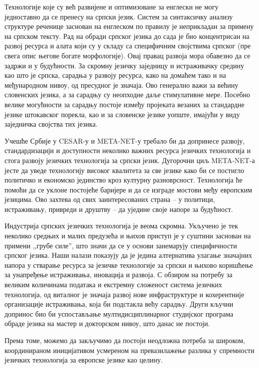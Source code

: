 {\begin{multicols}{2}
Технологије које су већ развијене и оптимизоване за енглески не могу једноставно да се пренесу на српски језик. Систем за синтаксичку анализу структуре реченице заснован на енглеском по правилу је неприкладан за примену на српском тексту. Рад на обради српског језика до сада је био концентрисан на развој ресурса и алата који су у складу са специфичним својствима српског (пре свега опис његове богате морфологије). Овај правац развоја мора обавезно да се задржи и у будућности. 
За скромну језичку заједницу и истраживачку средину као што је српска, сарадња у развоју ресурса, како на домаћем тако и на међународном нивоу,  од пресудног је значаја. Ово генерално  важи за већину словенских језика, а за сарадњу су неопходне даље стимулативне мере. Посебно велике могућности за сарадњу постоје између пројеката везаних за стандардне језике штокавског порекла, као и за словенске језике уопште, имајући у виду заједничка својства тих језика. 

Учешће Србије у CESAR-у и META-NET-у требало би да допринесе развоју, стандардизацији и доступности неколико важних ресурса језичких технологија и стога развоју језичких технологија за српски језик. Дугорочни циљ META-NET-а јесте да уведе технологију високог квалитета за све језике како би се постигло политичко и економско јединство кроз културну разноврсност. Технологија ће помоћи да се уклоне постојеће баријере и да се изграде мостови међу европским језицима. Ово захтева од свих заинтересованих страна – у политици, истраживању, привреди и друштву – да уједине своје напоре за будућност. 

Индустрија српских језичких технологија је веома скромна. Укључено је тек неколико средњих и малих предузећа и њихов приступ је у суштини заснован на примени ,,грубе силе'', што значи да се у основи занемарују специфичности српског језика. Наши налази показују да је једина алтернатива улагање значајних напора у стварање ресурса за језичке технологије за српски и њихово коришћење за унапређење истраживања, иновација и развоја. С обзиром на потребу за великим количинама података и екстремну сложеност система језичких технологија, од виталног је значаја развој нове инфраструктуре и кохерентније организације истраживања, која би подстакла већу сарадњу. Други кључни допринос био би успостављање мул\-ти\-дис\-ци\-пли\-нар\-ног студијског програма обраде језика на мастер и докторском нивоу, што данас не постоји.

Према томе, можемо да закључимо да постоји неодложна потреба за широком, координираном иницијативом усмереном на превазилажење разлика у спремности језичких технологија за европске језике као целину. 



\end{multicols}}
